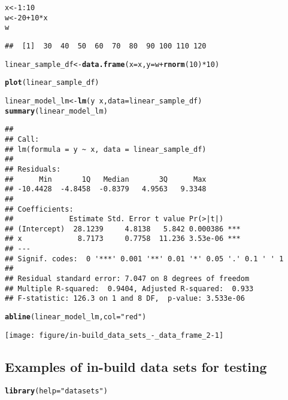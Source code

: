 \documentclass[a4paper,10pt]{book}\usepackage[]{graphicx}\usepackage[]{color}
\makeatletter
\def\maxwidth{ %
  \ifdim\Gin@nat@width>\linewidth
    \linewidth
  \else
    \Gin@nat@width
  \fi
}
\newcommand{\hlnum}[1]{\textcolor[rgb]{0.686,0.059,0.569}{#1}}%
\newcommand{\hlstr}[1]{\textcolor[rgb]{0.192,0.494,0.8}{#1}}%
\newcommand{\hlopt}[1]{\textcolor[rgb]{0,0,0}{#1}}%
\newcommand{\hlstd}[1]{\textcolor[rgb]{0.345,0.345,0.345}{#1}}%
\newcommand{\hlkwb}[1]{\textcolor[rgb]{0.69,0.353,0.396}{#1}}%
\newcommand{\hlkwc}[1]{\textcolor[rgb]{0.333,0.667,0.333}{#1}}%
\newcommand{\hlkwd}[1]{\textcolor[rgb]{0.737,0.353,0.396}{\textbf{#1}}}%
\newenvironment{kframe}{%
 \def\at@end@of@kframe{}%
 \ifinner\ifhmode%
  \def\at@end@of@kframe{\end{minipage}}%
  \begin{minipage}{\columnwidth}%
 \fi\fi%
 \def\FrameCommand##1{\hskip\@totalleftmargin \hskip-\fboxsep
 \colorbox{shadecolor}{##1}\hskip-\fboxsep
     \hskip-\linewidth \hskip-\@totalleftmargin \hskip\columnwidth}%
 \MakeFramed {\advance\hsize-\width
   \@totalleftmargin\z@ \linewidth\hsize
   \@setminipage}}%
 {\par\unskip\endMakeFramed%
 \at@end@of@kframe}
\newenvironment{knitrout}{}{} %
\makeatother
\begin{document}
\begin{knitrout}
\color{fgcolor}\begin{kframe}
\begin{alltt}
\hlstd{x} \hlkwb{<-} \hlnum{1}\hlopt{:}\hlnum{10}
\hlstd{w} \hlkwb{<-} \hlnum{20} \hlopt{+} \hlnum{10}\hlopt{*}\hlstd{x}
\hlstd{w}
\end{alltt}
\begin{verbatim}
##  [1]  30  40  50  60  70  80  90 100 110 120
\end{verbatim}
\begin{alltt}
\hlstd{linear_sample_df} \hlkwb{<-} \hlkwd{data.frame}\hlstd{(}\hlkwc{x}\hlstd{=x,} \hlkwc{y}\hlstd{=w} \hlopt{+} \hlkwd{rnorm}\hlstd{(}\hlnum{10}\hlstd{)}\hlopt{*}\hlnum{10}\hlstd{)}

\hlkwd{plot}\hlstd{(linear_sample_df)}

\hlstd{linear_model_lm} \hlkwb{<-} \hlkwd{lm}\hlstd{(y} \hlopt{~} \hlstd{x,} \hlkwc{data}\hlstd{=linear_sample_df)}
\hlkwd{summary}\hlstd{(linear_model_lm)}
\end{alltt}
\begin{verbatim}
## 
## Call:
## lm(formula = y ~ x, data = linear_sample_df)
## 
## Residuals:
##      Min       1Q   Median       3Q      Max 
## -10.4428  -4.8458  -0.8379   4.9563   9.3348 
## 
## Coefficients:
##             Estimate Std. Error t value Pr(>|t|)    
## (Intercept)  28.1239     4.8138   5.842 0.000386 ***
## x             8.7173     0.7758  11.236 3.53e-06 ***
## ---
## Signif. codes:  0 '***' 0.001 '**' 0.01 '*' 0.05 '.' 0.1 ' ' 1
## 
## Residual standard error: 7.047 on 8 degrees of freedom
## Multiple R-squared:  0.9404,	Adjusted R-squared:  0.933 
## F-statistic: 126.3 on 1 and 8 DF,  p-value: 3.533e-06
\end{verbatim}
\begin{alltt}
\hlkwd{abline}\hlstd{(linear_model_lm,} \hlkwc{col}\hlstd{=}\hlstr{"red"}\hlstd{)}
\end{alltt}
\end{kframe}
\texttt{[image: figure/in-build\_data\_sets\_-\_data\_frame\_2-1]} 

\end{knitrout}


\subsection{Examples of in-build data sets for testing}

\begin{knitrout}
\color{fgcolor}\begin{kframe}
\begin{alltt}
\hlkwd{library}\hlstd{(}\hlkwc{help} \hlstd{=} \hlstr{"datasets"}\hlstd{)}
\end{alltt}
\end{kframe}
\end{knitrout}
\end{document}
